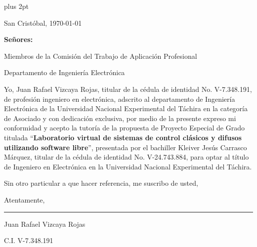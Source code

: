 \begin{titlepage}
\parskip=7.25pt plus 2pt
\setcounter{page}{3}
\begin{flushright}
	San Cristóbal, \today
\end{flushright}

\vspace{1cm}
\vfill

\begin{flushleft}
		\singlespacing
		
		\setlength{\parskip}{0pt}
		
		\textbf{Señores:}
		
		Miembros de la Comisión del Trabajo de Aplicación Profesional
		
		Departamento de Ingeniería Electrónica
		
\end{flushleft}

\vfill
\begin{spacing}{1.5}
	Yo, Juan Rafael Vizcaya Rojas, titular de la cédula de identidad No. \mbox{V-7.348.191}, de profesión ingeniero en electrónica, adscrito al departamento de Ingeniería Electrónica de la Universidad Nacional Experimental del Táchira en la categoría de Asociado y con dedicación exclusiva, por medio de la presente expreso mi conformidad y acepto la tutoría de la propuesta de Proyecto Especial de Grado titulada \enquote{\textbf{Laboratorio virtual de sistemas de control clásicos y difusos utilizando software libre}}, presentada por el bachiller Kleiver Jesús Carrasco Márquez, titular de la cédula de identidad No. \mbox{V-24.743.884}, para optar al título de Ingeniero en Electrónica en la Universidad Nacional Experimental del Táchira.
	
	Sin otro particular a que hacer referencia, me suscribo de usted,
	
	\setlength{\parskip}{20pt} 
	
	\noindent Atentamente,
\end{spacing}

\vfill

\begin{center}
	
	\rule{6cm}{1pt}
	
	\vspace{0.2cm}
	
	Juan Rafael Vizcaya Rojas
	
	\setlength{\parskip}{0pt}
	
	C.I. V-7.348.191
\end{center}

\vspace{0.5cm}
\end{titlepage}